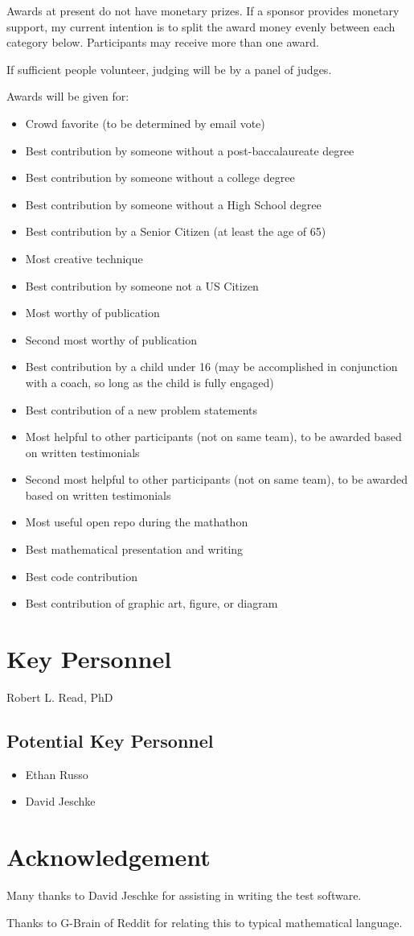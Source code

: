 \documentclass[11pt]{article}
\begin{document}
Awards at present do not have monetary prizes. If a sponsor provides monetary support, my current intention is to split
the award money evenly between each category below. Participants may receive more than one award.

If sufficient people volunteer, judging will be by a panel of judges.

Awards will be given for:
\begin{itemize}
\item Crowd favorite (to be determined by email vote)
\item Best contribution by someone without a post-baccalaureate degree
\item Best contribution by someone without a college degree
\item Best contribution by someone without a High School degree
\item Best contribution by a Senior Citizen (at least the age of 65)
\item Most creative technique
\item Best contribution by someone not a US Citizen
\item Most worthy of publication
\item Second most worthy of publication
\item Best contribution by a child under 16 (may be accomplished in conjunction with a coach, so long as the child is fully engaged)
\item Best contribution of a new problem statements
\item Most helpful to other participants (not on same team), to be awarded based on written testimonials
\item Second most helpful to other participants (not on same team), to be awarded based on written testimonials
\item Most useful open repo during the mathathon
\item Best mathematical presentation and writing
\item Best code contribution
\item Best contribution of graphic art, figure, or diagram
\end{itemize}

\section{Key Personnel}

Robert L. Read, PhD

\subsection{Potential Key Personnel}

\begin{itemize}
\item Ethan Russo
\item David Jeschke
\end{itemize}





\section{Acknowledgement}

Many thanks to David Jeschke for assisting in writing the test software.

Thanks to G-Brain of Reddit for relating this to typical mathematical language.
\end{document}
